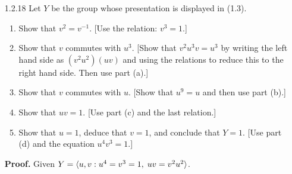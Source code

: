 \begin{enumerate}
      \begin{enumerate}
         \item Let $n = 3k$ and consider $r, s \in D_6$. We have
               $r^n = r^{3k} = (r^3)^k = 1^k = 1$; also,
               $rs = sr^{-1} = sr^{-1}r^3 = sr^2$ (since $r^3  = 1$). So $r$
               (resp. $s$) satisfies the relations that $x$ (resp. $y$)
               satisfies. Similarly, $x^3 = y^2 = 1$ and
               $xy = yx^2 = yx^{-1+3} = yx^{-1}x^3 = yx^{-1}$, so that $x$ and
               $y$ satisfy the relations of $r$ and $s$, respectively. Thus,
               $|X_{2n}| = |D_6| = 6$.
         \item Suppose $(3, n) = 1$. Thus there exist integers $p$ and $q$ such
               that $1 = 3p + nq$. So
               $x^1 = x^{3p+nq} = (x^3)^p(x^n)^q = 1^p1^q = 1$. Thus
               $X_{2n} = \cyc{y : y^2 = 1}$, so that $|X_{2n}| = 2$.
      \end{enumerate} \qed
   \item[1.2.18]  Let $Y$ be the group whose presentation is displayed in (1.3).
                  \begin{enumerate}
                     \item Show that $v^2 = v^{-1}$.
                           [Use the relation: $v^3 = 1$.]
                     \item Show that $v$ commutes with $u^3$. [Show that
                           $v^2u^3v = u^3$ by writing the left hand side as
                           $(v^2u^2)(uv)$ and using the relations to reduce this
                           to the right hand side. Then use part (a).]
                     \item Show that $v$ commutes with $u$. [Show that $u^9 = u$
                           and then use part (b).]
                     \item Show that $uv = 1$. [Use part (c) and the last
                           relation.]
                     \item Show that $u = 1$, deduce that $v = 1$, and conclude
                           that $Y = 1$. [Use part (d) and the equation
                           $u^4v^3 = 1$.]
                  \end{enumerate}

      \textbf{Proof.} Given $Y = \langle u, v :  u^4 = v^3 = 1, \; uv = v^2u^2 \rangle$.


\end{enumerate}
